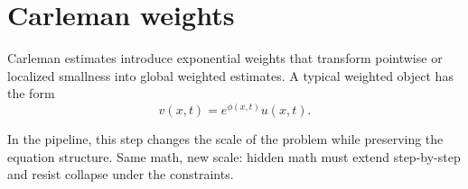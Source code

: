 \section{Carleman weights}

Carleman estimates introduce exponential weights that transform pointwise or localized smallness into global weighted estimates.
A typical weighted object has the form
\[
v(x,t) = e^{\phi(x,t)} u(x,t).
\]

In the pipeline, this step changes the scale of the problem while preserving the equation structure.
Same math, new scale: hidden math must extend step-by-step and resist collapse under the constraints.
